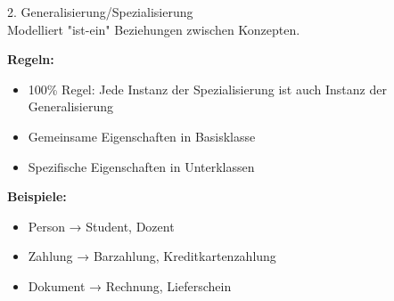 \begin{concept}{2. Generalisierung/Spezialisierung}\\
Modelliert "ist-ein" Beziehungen zwischen Konzepten.

\textbf{Regeln:}
\begin{itemize}
    \item 100\% Regel: Jede Instanz der Spezialisierung ist auch Instanz der Generalisierung
    \item Gemeinsame Eigenschaften in Basisklasse
    \item Spezifische Eigenschaften in Unterklassen
\end{itemize}

\textbf{Beispiele:}
\begin{itemize}
    \item Person → Student, Dozent
    \item Zahlung → Barzahlung, Kreditkartenzahlung
    \item Dokument → Rechnung, Lieferschein
\end{itemize}

\end{concept}

